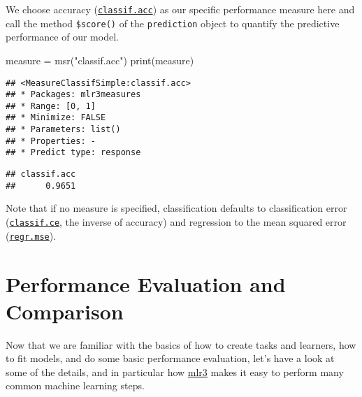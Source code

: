 \documentclass[
]{scrbook}
\newenvironment{Shaded}{\begin{snugshade}}{\end{snugshade}}
\newcommand{\FunctionTok}[1]{\textcolor[rgb]{0.00,0.00,0.00}{#1}}
\newcommand{\NormalTok}[1]{#1}
\newcommand{\OtherTok}[1]{\textcolor[rgb]{0.56,0.35,0.01}{#1}}
\newcommand{\SpecialCharTok}[1]{\textcolor[rgb]{0.00,0.00,0.00}{#1}}
\newcommand{\StringTok}[1]{\textcolor[rgb]{0.31,0.60,0.02}{#1}}
\renewenvironment{Shaded} {\begin{snugshade}\small} {\end{snugshade}}
\begin{document}
We choose accuracy (\href{https://mlr3.mlr-org.com/reference/mlr_measures_classif.acc.html}{\texttt{classif.acc}}) as our specific performance measure here and call the method \texttt{\$score()} of the \texttt{prediction} object to quantify the predictive performance of our model.

\begin{Shaded}
\begin{Highlighting}[]
\NormalTok{measure }\OtherTok{=} \FunctionTok{msr}\NormalTok{(}\StringTok{"classif.acc"}\NormalTok{)}
\FunctionTok{print}\NormalTok{(measure)}
\end{Highlighting}
\end{Shaded}

\begin{verbatim}
## <MeasureClassifSimple:classif.acc>
## * Packages: mlr3measures
## * Range: [0, 1]
## * Minimize: FALSE
## * Parameters: list()
## * Properties: -
## * Predict type: response
\end{verbatim}

\begin{Shaded}
\end{Shaded}

\begin{verbatim}
## classif.acc 
##      0.9651
\end{verbatim}

Note that if no measure is specified, classification defaults to classification error (\href{https://mlr3.mlr-org.com/reference/mlr_measures_classif.ce.html}{\texttt{classif.ce}}, the inverse of accuracy) and regression to the mean squared error (\href{https://mlr3.mlr-org.com/reference/mlr_measures_regr.mse.html}{\texttt{regr.mse}}).

\hypertarget{perf-eval-cmp}{%
\chapter{Performance Evaluation and Comparison}\label{perf-eval-cmp}}

Now that we are familiar with the basics of how to create tasks and learners, how to fit models, and do some basic performance evaluation, let's have a look at some of the details, and in particular how \href{https://mlr3.mlr-org.com}{mlr3} makes it easy to perform many common machine learning steps.
\end{document}
